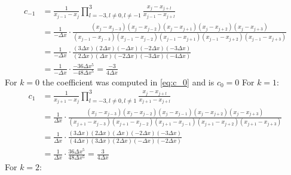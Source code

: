 \begin{equation}
	\begin{aligned}
		c_{-1} & = \frac{1}{x_{j-1} - x_j} \prod_{l=-3, l \neq 0, l \neq -1}^3 \frac{x_j - x_{j+l}}{x_{j-1} - x_{j+l}}                                                                                                                   \\
		       & = \frac{1}{-\Delta x} \cdot \frac{(x_j - x_{j-3})(x_j - x_{j-2})(x_j - x_{j+1})(x_j - x_{j+2})(x_j - x_{j+3})}{(x_{j-1} - x_{j-3})(x_{j-1} - x_{j-2})(x_{j-1} - x_{j+1})(x_{j-1} - x_{j+2})(x_{j-1} - x_{j+3})} \\
		       & = \frac{1}{-\Delta x} \cdot \frac{(3\Delta x)(2\Delta x)(-\Delta x)(-2\Delta x)(-3\Delta x)}{(2\Delta x)(\Delta x)(-2\Delta x)(-3\Delta x)(-4\Delta x)}                                                            \\
		       & = \frac{1}{-\Delta x} \cdot \frac{-36 \Delta x^5}{-48 \Delta x^5} = \frac{-3}{4\Delta x}
	\end{aligned}
\end{equation}
For $k = 0 $ the coefficient was computed in \eqref{eq:c_0} and is $c_0 = 0$\newline
For $k = 1$:
\begin{equation}
	\begin{aligned}
		c_{1} & = \frac{1}{x_{j+1} - x_j} \prod_{l=-3, l \neq 0, l \neq 1}^3 \frac{x_j - x_{j+l}}{x_{j+1} - x_{j+l}}                                                                                                                   \\
		      & = \frac{1}{\Delta x} \cdot \frac{(x_j - x_{j-3})(x_j - x_{j-2})(x_j - x_{j-1})(x_j - x_{j+2})(x_j - x_{j+3})}{(x_{j+1} - x_{j-3})(x_{j+1} - x_{j-2})(x_{j+1} - x_{j-1})(x_{j+1} - x_{j+2})(x_{j+1} - x_{j+3})} \\
		      & = \frac{1}{\Delta x} \cdot \frac{(3\Delta x)(2\Delta x)(\Delta x)(-2\Delta x)(-3\Delta x)}{(4\Delta x)(3\Delta x)(2\Delta x)(-\Delta x)(-2\Delta x)}                                                               \\
		      & =  \frac{1}{\Delta x} \cdot \frac{36 \Delta x^5}{48 \Delta x^5} = \frac{3}{4\Delta x}
	\end{aligned}
\end{equation}
For $k = 2$:
